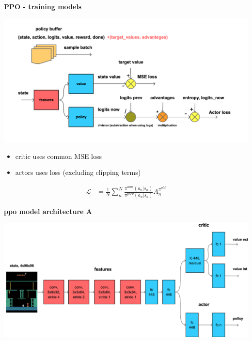 \documentclass[xcolor=dvipsnames]{beamer}
\begin{document}
\begin{frame}{\bf PPO - training models}

  \centering
  \includegraphics[scale=0.12]{../diagrams/basic/ppotrain.png}

  \begin{itemize}
    \item critic uses common MSE loss
    \item actors uses loss (excluding clipping terms)
  \end{itemize}

  \begin{align*}
  \mathcal{L} &= \frac{1}{N} \sum_{n}^{N} \frac{\pi^{now}(a_n | s_n)} {\pi^{prev}(a_n | s_n)} A_n^{{\pi}^{old}}
  \end{align*} 

\end{frame}




\begin{frame}{\bf ppo model architecture A}

\centering
\includegraphics[scale=0.12]{../diagrams/rnd/modelppoa.png}

\end{frame}
\end{document}
